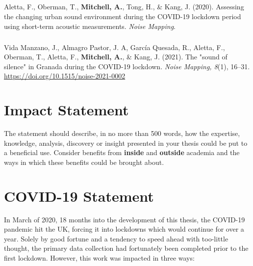 \documentclass[oneside,fontsize=13pt,titlepage]{scrbook}
\begin{document}
\paragraph*{}Aletta, F., Oberman, T., \textbf{Mitchell, A.}, Tong, H., \& Kang, J. (2020). Assessing the changing urban sound environment during the COVID-19 lockdown period using short-term acoustic measurements. \emph{Noise Mapping}.

\paragraph*{}Vida Manzano, J., Almagro Pastor, J. A, Garc\'ia Quesada, R., Aletta, F., Oberman, T., Aletta, F., \textbf{Mitchell, A.}, \& Kang, J. (2021). The "sound of silence" in Granada during the COVID-19 lockdown. \emph{Noise Mapping, 8}(1), 16--31. \url{https://doi.org/10.1515/noise-2021-0002} 





\chapter*{Impact Statement}
The statement should describe, in no more than 500 words, how the expertise, knowledge, analysis, discovery or insight presented in your thesis could be put to a beneficial use. Consider benefits from \textbf{inside} and \textbf{outside} academia and the ways in which these benefits could be brought about.

\chapter*{COVID-19 Statement}

In March of 2020, 18 months into the development of this thesis, the COVID-19 pandemic hit the UK, forcing it into lockdowns which would continue for over a year. Solely by good fortune and a tendency to speed ahead with too-little thought, the primary data collection had fortunately been completed prior to the first lockdown. However, this work was impacted in three ways:
\end{document}
